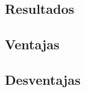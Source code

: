 \documentclass[12pt,spanish]{article}
\begin{document}





\subsection{Resultados}
\subsection{Ventajas}
\subsection{Desventajas}
\end{document}
